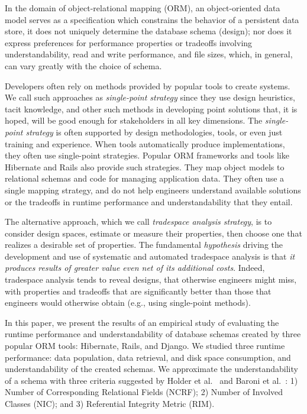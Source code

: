\documentclass[10pt,conference]{IEEEtran}
\begin{document}
In the domain of object-relational mapping (ORM), an object-oriented data model serves as a specification which constrains the behavior of a persistent data store, it does not uniquely determine the database schema (design); nor does it express preferences for performance properties or tradeoffs involving understandability, read and write performance, and file sizes, which, in general, can vary greatly with the choice of schema. 

Developers often rely on methods provided by popular tools to create systems. We call such approaches as \textit{single-point strategy} since they use design heuristics, tacit knowledge, and other such methods in developing point solutions that, it is hoped, will be good enough for stakeholders in all key dimensions. The \textit{single-point strategy} is often supported by design methodologies, tools, or even just training and experience. When tools automatically produce implementations, they often use single-point strategies. Popular ORM frameworks and tools like Hibernate and Rails also provide such strategies. They map object models to relational schemas and code for managing application data. They often use a single mapping strategy, and do not help engineers understand available solutions or the tradeoffs in runtime performance and understandability that they entail.

The alternative approach, which we call {\em tradespace analysis strategy}, is to consider design spaces, estimate or measure their properties, then choose one that realizes a desirable set of properties. The fundamental {\em hypothesis} driving the development and use of systematic and automated tradespace analysis is that {\em it produces results of greater value even net of its additional costs}. Indeed, tradespace analysis tends to reveal designs, that otherwise engineers might miss, with properties and tradeoffs that are significantly better than those that engineers would otherwise obtain (e.g., using single-point methods).

In this paper, we present the results of an empirical study of evaluating the runtime performance and understandability of database schemas created by three popular ORM tools: Hibernate, Rails, and Django. We studied three runtime performance: data population, data retrieval, and disk space consumption, and understandability of the created schemas. We approximate the understandability of a schema with three criteria suggested by Holder et al.~\cite{stefan_holder_towardsmetrics_2008} and Baroni et al.~\cite{baroni_formal_2005}: 1) Number of Corresponding Relational Fields (NCRF); 2) Number of Involved Classes (NIC); and 3) Referential Integrity Metric (RIM).
\end{document}
